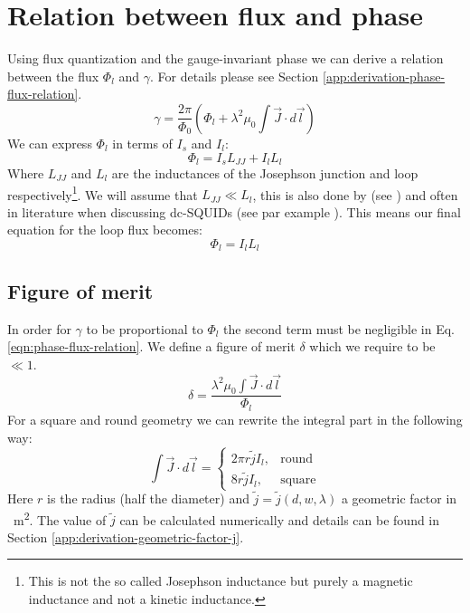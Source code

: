 \section{Relation between flux and phase}
Using flux quantization and the gauge-invariant phase we can derive a relation between the flux $\Phi_l$ and $\gamma$. For details please see Section \ref{app:derivation-phase-flux-relation}.
\begin{equation}
	\gamma = \frac{2\pi}{\Phi_0}\left(\Phi_l + \lambda^2\mu_0 \int \vec{J}\cdot d \vec{l} \right)
	\label{eqn:phase-flux-relation}
\end{equation}
We can express $\Phi_l$ in terms of $I_s$ and $I_l$:
\begin{equation}
	\Phi_l = I_sL_{JJ}  + I_lL_l
\end{equation}
Where $L_{JJ}$ and $L_l$ are the inductances of the Josephson junction and loop respectively\footnote{This is not the so called Josephson inductance but purely a magnetic inductance and not a kinetic inductance.}. We will assume that $L_{JJ} \ll L_l$, this is also done by \citeauthor{frolovMeasurementCurrentPhaseRelation2004} (see \cite{frolovCurrentphaseRelationsJosephson2005,frolovMeasurementCurrentPhaseRelation2004}) and often in literature when discussing dc-SQUIDs (see par example \cite{clarkeSQUIDHandbook2004}). This means our final equation for the loop flux becomes:
\begin{equation}
	\Phi_l = I_lL_l
\end{equation}

\subsection{Figure of merit}
\label{sec:figure-of-merit}
In order for $\gamma$ to be proportional to $\Phi_l$ the second term must be negligible in Eq. \ref{eqn:phase-flux-relation}. We define a figure of merit $\delta$ which we require to be $\ll 1$.
\begin{equation}
	\delta = \frac{\lambda^2\mu_0 \int \vec{J}\cdot d \vec{l}}{\Phi_l}
\end{equation}
For a square and round geometry we can rewrite the integral part in the following way:
\begin{equation}
	\int \vec{J}\cdot d \vec{l} = \begin{cases}
		2\pi r \tilde{j} I_l, &\text{round} \\
		8r \tilde{j} I_l, &\text{square}
	\end{cases}
\end{equation}
Here $r$ is the radius (half the diameter) and $\tilde{j} = \tilde{j}(d, w, \lambda)$ a geometric factor in \unit{\per\square\meter}. The value of $\tilde{j}$ can be calculated numerically and details can be found in Section \ref{app:derivation-geometric-factor-j}.

